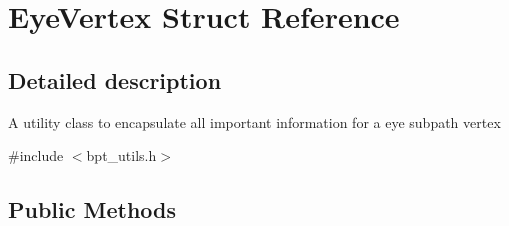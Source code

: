 \hypertarget{struct_eye_vertex}{}\section{Eye\+Vertex Struct Reference}
\label{struct_eye_vertex}


\subsection{Detailed description}
\begin{DoxyParagraph}{}
A utility class to encapsulate all important information for a eye subpath vertex 
\end{DoxyParagraph}


{\ttfamily \#include $<$bpt\+\_\+utils.\+h$>$}

\subsection*{Public Methods}
